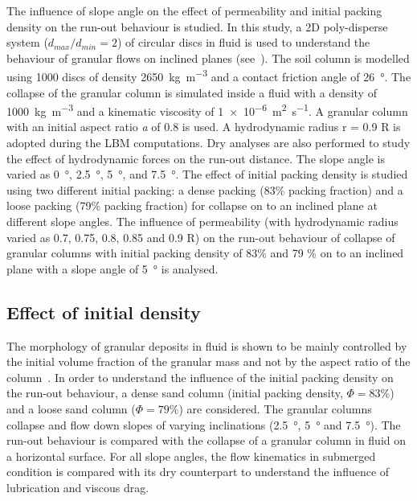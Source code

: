 The influence of slope angle on the effect of permeability and initial packing 
density on the run-out behaviour is studied. In this study, a 2D poly-disperse 
system ($d_{max}/d_{min} = 2$) of circular discs in fluid is used to understand 
the behaviour of granular flows on inclined planes (see~). The 
soil column is modelled using 1000 discs of density 
\SI{2650}{\kg\per\cubic\meter} and a contact friction angle of 
\SI{26}{\degree}. The collapse of the granular column is simulated inside a 
fluid with a density of \SI{1000}{\kg\per\cubic\meter} and a kinematic 
viscosity of \SI{1e-6}{\square\meter\per\second}. A granular column with an 
initial aspect ratio \textit{a} of 0.8 is used. A hydrodynamic radius r = 0.9 R 
is adopted during the LBM computations. Dry analyses are also performed to 
study the effect of hydrodynamic forces on the run-out distance. The slope 
angle is varied as \SI{0}{\degree}, \SI{2.5}{\degree}, \SI{5}{\degree}, and 
\SI{7.5}{\degree}. The effect of initial packing density is studied using two 
different initial packing: a dense packing (83\% packing fraction) and a loose 
packing (79\% packing fraction) for collapse on to an inclined plane at 
different slope angles. The influence of permeability (with hydrodynamic radius 
varied as 0.7, 0.75, 0.8, 0.85 and 0.9 R) on the run-out behaviour of collapse 
of granular columns with initial packing density of 83\% and 79 \% on to an 
inclined plane with a slope angle of 5~\si{\degree} is analysed.


\subsection{Effect of initial density}
The morphology of granular deposits in fluid is shown to be mainly 
controlled by the initial volume fraction of the granular mass and not by the 
aspect ratio of the column~\citep{Rondon2011,Pailha2008}. In order to 
understand the influence of the initial packing density on the run-out 
behaviour, a dense sand column (initial packing density, $\Phi=83\%$) and a 
loose sand column ($\Phi=79\%$) are considered. The granular columns collapse 
and flow down slopes of varying inclinations (\SI{2.5}{\degree}, 
\SI{5}{\degree} and \SI{7.5}{\degree}). The run-out behaviour is compared with 
the collapse of a granular column in fluid on a horizontal surface. For all 
slope angles, the 
flow kinematics in submerged condition is compared with its dry counterpart to 
understand the influence of lubrication and viscous drag.


